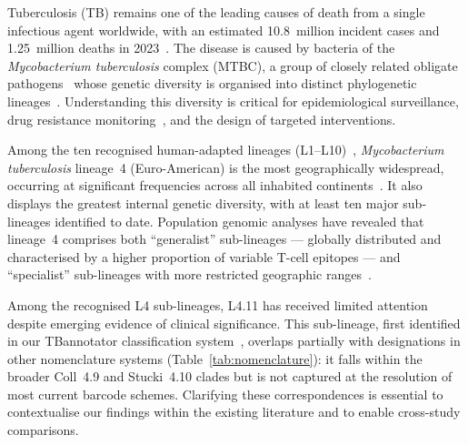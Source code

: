 \documentclass[11pt,a4paper]{article}
\newcommand{\mtb}{\textit{Mycobacterium tuberculosis}}
\newcommand{\lignee}[1]{\textsf{#1}}
\begin{document}
Tuberculosis (TB) remains one of the leading causes of death from a single
infectious agent worldwide, with an estimated 10.8~million incident cases and
1.25~million deaths in 2023~\cite{who2024}.  The disease is caused by bacteria
of the \mtb{} complex (MTBC), a group of closely related obligate pathogens~\cite{sreevatsan1997,brites2015}
whose genetic diversity is organised into distinct phylogenetic lineages~\cite{comas2013}.
Understanding this diversity is critical for epidemiological surveillance,
drug resistance monitoring~\cite{sahal2023}, and the design of targeted interventions.

Among the ten recognised human-adapted lineages (L1--L10)~\cite{guyeux2024}, \mtb{} lineage~4
(Euro-American) is the most geographically widespread, occurring at significant
frequencies across all inhabited continents~\cite{stucki2016}.  It also displays
the greatest internal genetic diversity, with at least ten major sub-lineages
identified to date.  Population genomic analyses have revealed that lineage~4
comprises both ``generalist'' sub-lineages --- globally distributed and
characterised by a higher proportion of variable T-cell epitopes --- and
``specialist'' sub-lineages with more restricted geographic
ranges~\cite{stucki2016}.

Among the recognised L4 sub-lineages, \lignee{L4.11} has received limited attention despite emerging evidence of clinical significance.  This sub-lineage, first identified in our TBannotator classification system~\cite{senelle2023}, overlaps partially with designations in other nomenclature systems (Table~\ref{tab:nomenclature}): it falls within the broader Coll~4.9 and Stucki~4.10 clades but is not captured at the resolution of most current barcode schemes.  Clarifying these correspondences is essential to contextualise our findings within the existing literature and to enable cross-study comparisons.
\end{document}
